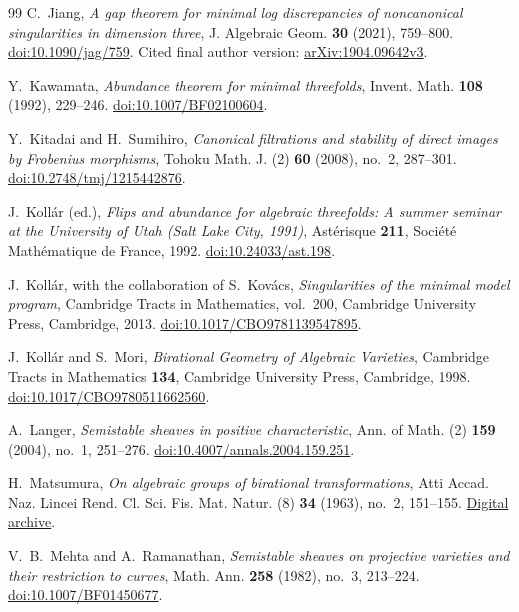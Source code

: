\begin{thebibliography}{99}
C.~Jiang,
\emph{A gap theorem for minimal log discrepancies of noncanonical
singularities in dimension three},
J. Algebraic Geom. \textbf{30} (2021), 759--800.
\href{https://doi.org/10.1090/jag/759}{doi:10.1090/jag/759}.
Cited final author version:
\href{https://arxiv.org/abs/1904.09642v3}{arXiv:1904.09642v3}.

Y.~Kawamata,
\emph{Abundance theorem for minimal threefolds},
Invent. Math. \textbf{108} (1992), 229--246.
\href{https://doi.org/10.1007/BF02100604}{doi:10.1007/BF02100604}.

Y.~Kitadai and H.~Sumihiro,
\emph{Canonical filtrations and stability of direct images by Frobenius morphisms},
Tohoku Math. J. (2) \textbf{60} (2008), no.~2, 287--301.
\href{https://doi.org/10.2748/tmj/1215442876}{doi:10.2748/tmj/1215442876}.

J.~Koll\'ar (ed.),
\emph{Flips and abundance for algebraic threefolds:
A summer seminar at the University of Utah (Salt Lake City, 1991)},
Ast\'erisque \textbf{211},
Soci\'et\'e Math\'ematique de France, 1992.
\href{https://doi.org/10.24033/ast.198}{doi:10.24033/ast.198}.

J.~Koll\'ar, with the collaboration of S.~Kov\'acs,
\emph{Singularities of the minimal model program},
Cambridge Tracts in Mathematics, vol.~200,
Cambridge University Press, Cambridge, 2013.
\href{https://doi.org/10.1017/CBO9781139547895}{doi:10.1017/CBO9781139547895}.

J.~Koll\'ar and S.~Mori,
\emph{Birational Geometry of Algebraic Varieties},
Cambridge Tracts in Mathematics \textbf{134},
Cambridge University Press, Cambridge, 1998.
\href{https://doi.org/10.1017/CBO9780511662560}{doi:10.1017/CBO9780511662560}.

A.~Langer, \emph{Semistable sheaves in positive characteristic},
Ann. of Math. (2) \textbf{159} (2004), no.~1, 251--276.
\href{https://doi.org/10.4007/annals.2004.159.251}{doi:10.4007/annals.2004.159.251}.

H.~Matsumura,
\emph{On algebraic groups of birational transformations},
Atti Accad. Naz. Lincei Rend. Cl. Sci. Fis. Mat. Natur. (8)
\textbf{34} (1963), no.~2, 151--155.
\href{https://www.bdim.eu/item?id=RLINA_1963_8_34_2_151_0}{Digital archive}.

V.~B.~Mehta and A.~Ramanathan,
\emph{Semistable sheaves on projective varieties and their restriction to curves},
Math. Ann. \textbf{258} (1982), no.~3, 213--224.
\href{https://doi.org/10.1007/BF01450677}{doi:10.1007/BF01450677}.


\end{thebibliography}
